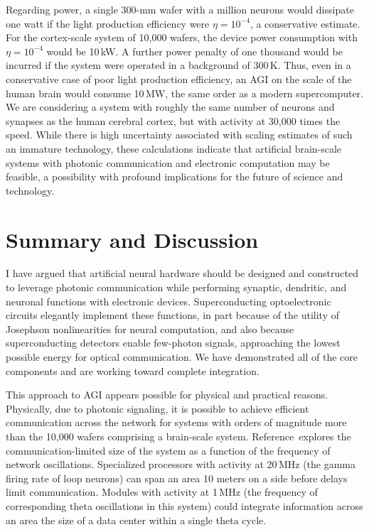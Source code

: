 \documentclass{article}
\newcommand{\onlinecite}[1]{\hspace{-1 ex} \nocite{#1}\citenum{#1}}
\begin{document}
\begin{multicols}{2}
Regarding power, a single 300-mm wafer with a million neurons would dissipate one watt if the light production efficiency were $\eta = 10^{-4}$, a conservative estimate. For the cortex-scale system of 10,000 wafers, the device power consumption with $\eta = 10^{-4}$ would be 10\,kW. A further power penalty of one thousand would be incurred if the system were operated in a background of 300\,K. Thus, even in a conservative case of poor light production efficiency, an AGI on the scale of the human brain would consume 10\,MW, the same order as a modern supercomputer. We are considering a system with roughly the same number of neurons and synapses as the human cerebral cortex, but with activity at 30,000 times the speed. While there is high uncertainty associated with scaling estimates of such an immature technology, these calculations indicate that artificial brain-scale systems with photonic communication and electronic computation may be feasible, a possibility with profound implications for the future of science and technology. 

\section{\label{sec:discussion}Summary and Discussion}
I have argued that artificial neural hardware should be designed and constructed to leverage photonic communication while performing synaptic, dendritic, and neuronal functions with electronic devices. Superconducting optoelectronic circuits elegantly implement these functions, in part because of the utility of Josephson nonlinearities for neural computation, and also because superconducting detectors enable few-photon signals, approaching the lowest possible energy for optical communication. We have demonstrated all of the core components and are working toward complete integration.

This approach to AGI appears possible for physical and practical reasons. Physically, due to photonic signaling, it is possible to achieve efficient communication across the network for systems with orders of magnitude more than the 10,000 wafers comprising a brain-scale system. Reference\,\onlinecite{sh2019} explores the communication-limited size of the system as a function of the frequency of network oscillations. Specialized processors with activity at 20\,MHz (the gamma firing rate of loop neurons) can span an area 10 meters on a side before delays limit communication. Modules with activity at 1\,MHz (the frequency of corresponding theta oscillations in this system) could integrate information across an area the size of a data center within a single theta cycle.


\end{multicols}
\end{document}
